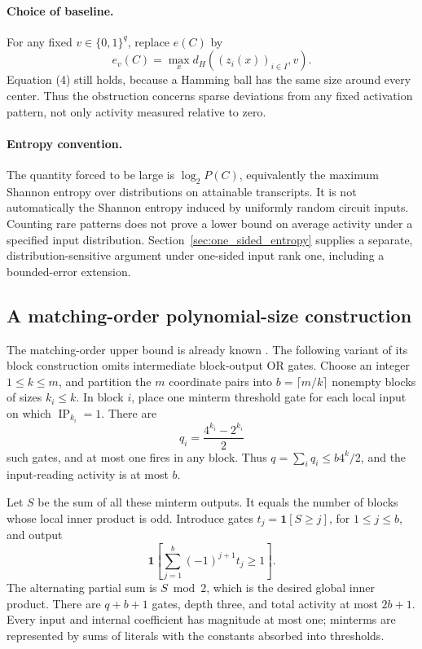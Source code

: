 \documentclass[11pt]{article}
\theoremstyle{definition}
\newcommand{\bits}{\{0,1\}}
\newcommand{\ind}[1]{\mathbf 1[#1]}
\newcommand{\ip}{\operatorname{IP}}
\begin{document}
\paragraph{Choice of baseline.}
For any fixed \(v\in\bits^q\), replace \(e(C)\) by
\[
 e_v(C)=\max_x d_H((z_i(x))_{i\in I},v).
\]
Equation (4) still holds, because a Hamming ball has the same size around every center. Thus the obstruction concerns sparse deviations from any fixed activation pattern, not only activity measured relative to zero.

\paragraph{Entropy convention.}
The quantity forced to be large is \(\log_2P(C)\), equivalently the maximum Shannon entropy over distributions on attainable transcripts. It is not automatically the Shannon entropy induced by uniformly random circuit inputs. Counting rare patterns does not prove a lower bound on average activity under a specified input distribution. Section~\ref{sec:one_sided_entropy} supplies a separate, distribution-sensitive argument under one-sided input rank one, including a bounded-error extension.

\subsection{A matching-order polynomial-size construction}\label{sec:upperenergy}
The matching-order upper bound is already known \cite[Example 12]{Uchizawa14}. The following variant of its block construction omits intermediate block-output OR gates.
Choose an integer \(1\le k\le m\), and partition the \(m\) coordinate pairs into \(b=\lceil m/k\rceil\) nonempty blocks of sizes \(k_i\le k\). In block \(i\), place one minterm threshold gate for each local input on which \(\ip_{k_i}=1\). There are
\[
 q_i=\frac{4^{k_i}-2^{k_i}}2
\]
such gates, and at most one fires in any block. Thus \(q=\sum_iq_i\le b4^k/2\), and the input-reading activity is at most \(b\).

Let \(S\) be the sum of all these minterm outputs. It equals the number of blocks whose local inner product is odd. Introduce gates
\(t_j=\ind{S\ge j}\), for \(1\le j\le b\), and output
\[
 \ind{\sum_{j=1}^b(-1)^{j+1}t_j\ge1}.
\]
The alternating partial sum is \(S\bmod2\), which is the desired global inner product.
There are \(q+b+1\) gates, depth three, and total activity at most \(2b+1\).
Every input and internal coefficient has magnitude at most one; minterms are represented by sums of literals with the constants absorbed into thresholds.
\end{document}
